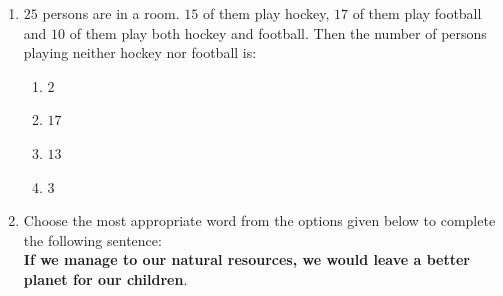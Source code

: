 \documentclass[journal]{IEEEtran}
\begin{document}
\begin{enumerate}
    \item $25$ persons are in a room. $15$ of them play hockey, $17$ of them play football and $10$ of them play both hockey and football. Then the number of persons playing neither hockey nor football is:
    \begin{enumerate}
    \item $2$
    \item $17$
    \item $13$
    \item $3$
    \end{enumerate}
    \item Choose the most appropriate word from the options given below to complete the following sentence:\\
    \textbf{If we manage to \underline{\hspace{2cm}} our natural resources, we would leave a better planet for our children}.


\end{enumerate}
\end{document}
